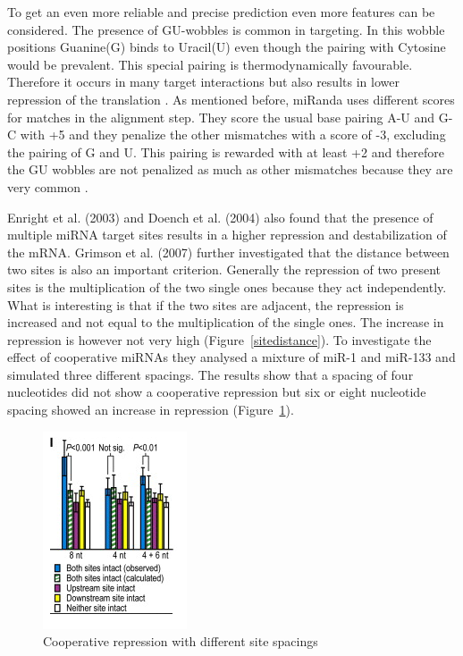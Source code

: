 \documentclass[12pt]{article}
\begin{document}
To get an even more reliable and precise prediction even more features can be considered. The presence of GU-wobbles is common in targeting. In this wobble positions Guanine(G) binds to Uracil(U) even though the pairing with Cytosine would be prevalent. This special pairing is thermodynamically favourable. Therefore it occurs in many target interactions but also results in lower repression of the translation \cite{Doench}. As mentioned before, miRanda uses different scores for matches in the alignment step. They score the usual base pairing A-U and G-C with +5 and they penalize the other mismatches with a score of -3, excluding the pairing of G and U. This pairing is rewarded with at least +2 and therefore the GU wobbles are not penalized as much as other mismatches because they are very common \cite{Enright}. 

Enright et al. (2003) and Doench et al. (2004) also found that the presence of multiple miRNA target sites results in a higher repression and destabilization of the mRNA. Grimson et al. (2007) further investigated that the distance between two sites is also an important criterion. Generally the repression of two present sites is the multiplication of the two single ones because they act independently. What is interesting is that if the two sites are adjacent, the repression is increased and not equal to the multiplication of the single ones. The increase in repression is however not very high (Figure~\ref{sitedistance}). To investigate the effect of cooperative miRNAs they analysed a mixture of miR-1 and miR-133 and simulated three different spacings. The results show that a spacing of four nucleotides did not show a cooperative repression but six or eight nucleotide spacing showed an increase in repression (Figure~\ref{sitespacing}).


\begin{figure}[h]
\centering
\includegraphics[scale=1]{results/sites_8nt.PNG}  
\caption{Cooperative repression with different site spacings}
\label{sitespacing}
\end{figure}
\end{document}
